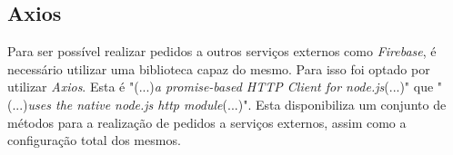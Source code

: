 \subsection{Axios}

Para ser possível realizar pedidos a outros serviços externos como \textit{Firebase}, é necessário utilizar uma biblioteca capaz do mesmo. Para isso foi optado por utilizar \textit{Axios}. Esta é "(...)\emph{a promise-based HTTP Client for node.js}(...)"\citep{axios} que "(...)\emph{uses the native node.js http module}(...)"\citep{axios}. Esta disponibiliza um conjunto de métodos para a realização de pedidos a serviços externos, assim como a configuração total dos mesmos.
